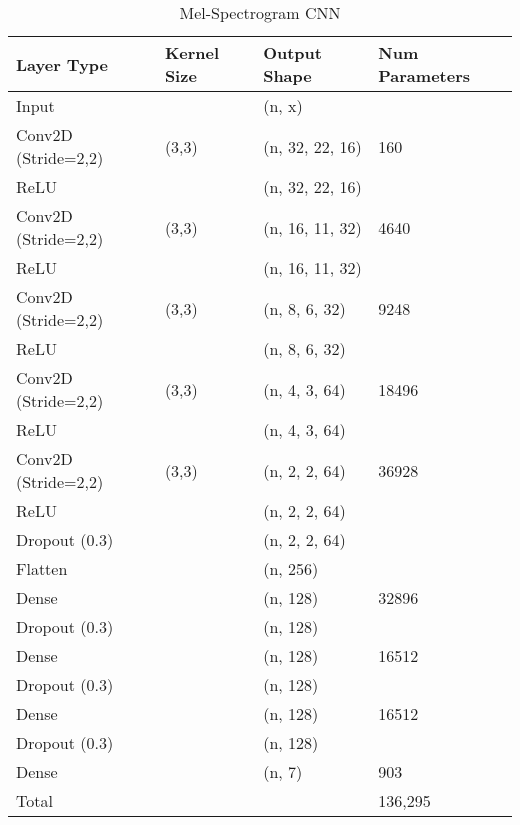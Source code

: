 \begin{table}[ht]
\caption{Mel-Spectrogram CNN}
\centering
\begin{tabular}{l|l|l|l}
Layer Type & Kernel Size & Output Shape & Num Parameters \\ \hline
Input & \ & (n, x) & \\
Conv2D (Stride=2,2) & (3,3) & (n, 32, 22, 16) & 160\\
ReLU                &       & (n, 32, 22, 16) & \\
Conv2D (Stride=2,2) & (3,3) & (n, 16, 11, 32) & 4640\\
ReLU                &       & (n, 16, 11, 32) & \\
Conv2D (Stride=2,2) & (3,3) & (n, 8, 6, 32) & 9248\\
ReLU                &       & (n, 8, 6, 32) & \\
Conv2D (Stride=2,2) & (3,3) & (n, 4, 3, 64) & 18496\\
ReLU                &       & (n, 4, 3, 64) & \\
Conv2D (Stride=2,2) & (3,3) & (n, 2, 2, 64) & 36928\\
ReLU                &       & (n, 2, 2, 64) & \\
Dropout (0.3)       &       & (n, 2, 2, 64) & \\
Flatten             &       & (n, 256) & \\
Dense 				& 		& (n, 128) & 32896\\
Dropout (0.3) 		& 		& (n, 128)  & \\
Dense 				& 		& (n, 128) & 16512\\
Dropout (0.3) 		& 		& (n, 128)  & \\
Dense 				& 		& (n, 128) & 16512\\
Dropout (0.3) 		& 		& (n, 128)  & \\
Dense               &       & (n, 7) & 903\\
\hline
\hline
Total               &       &        & 136,295\\
\end{tabular}
\end{table}
